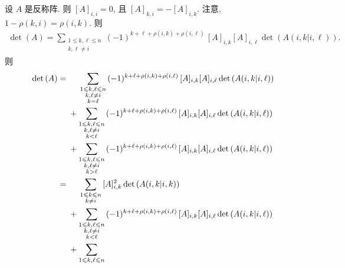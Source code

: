 \documentclass[../libro.tex]{subfiles}
\begin{document}
\begin{example}
    设 \(A\) 是反称阵.
    则 \([A]_{i,i} = 0\),
    且 \([A]_{k,i} = -[A]_{i,k}\).
    注意, \(1 - \rho(k, i) = \rho(i, k)\).
    则
    \begin{align*}
        \det {(A)}
        =
        \sum_{\substack{
                1 \leq k, \ell \leq n \\
        k, \ell \neq i}}
        {(-1)^{k+\ell+\rho(i,k)+\rho(i,\ell)}\,
        [A]_{i,k} [A]_{i,\ell} \det {(A({i,k}|{i,\ell}))}}.
    \end{align*}
    则
    \begin{align*}
        \det {(A)}
        = {} &
        \hphantom{{} + {}}
        \sum_{\substack{
                1 \leq k, \ell \leq n \\
                k, \ell \neq i        \\
        k = \ell}}
        {(-1)^{k+\ell+\rho(i,k)+\rho(i,\ell)}\,
        [A]_{i,k} [A]_{i,\ell} \det {(A({i,k}|{i,\ell}))}}
        \\
        &
        +
        \sum_{\substack{
                1 \leq k, \ell \leq n \\
                k, \ell \neq i        \\
        k < \ell}}
        {(-1)^{k+\ell+\rho(i,k)+\rho(i,\ell)}\,
        [A]_{i,k} [A]_{i,\ell} \det {(A({i,k}|{i,\ell}))}}
        \\
        &
        +
        \sum_{\substack{
                1 \leq k, \ell \leq n \\
                k, \ell \neq i        \\
        k > \ell}}
        {(-1)^{k+\ell+\rho(i,k)+\rho(i,\ell)}\,
        [A]_{i,k} [A]_{i,\ell} \det {(A({i,k}|{i,\ell}))}}
        \\
        = {} &
        \hphantom{{} + {}}
        \sum_{\substack{
                1 \leq k \leq n \\
        k \neq i}}
        { [A]_{i,k}^2 \det {(A({i,k}|{i,k}))}}
        \\
        &
        +
        \sum_{\substack{
                1 \leq k, \ell \leq n \\
                k, \ell \neq i        \\
        k < \ell}}
        {(-1)^{k+\ell+\rho(i,k)+\rho(i,\ell)}\,
        [A]_{i,k} [A]_{i,\ell} \det {(A({i,k}|{i,\ell}))}}
        \\
        &
        +
        \sum_{\substack{
                1 \leq k, \ell \leq n \\
}}
\end{align*}
\end{example}
\end{document}
